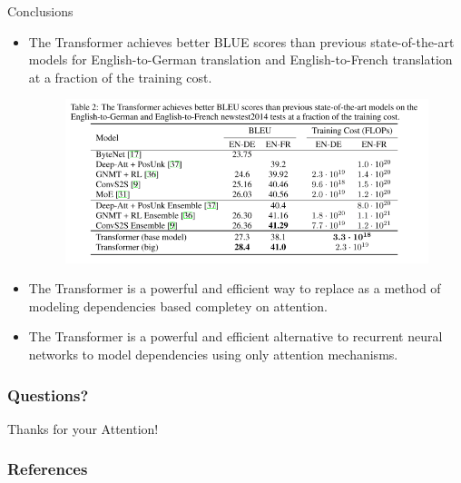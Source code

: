 \documentclass[handout]{beamer}
\begin{document}
\begin{frame}{Conclusions}
\begin{scriptsize}
\begin{itemize}

 \item The Transformer achieves better BLUE scores than previous state-of-the-art models for English-to-German translation and English-to-French translation at a fraction of the training cost.

      \begin{figure}[h]
        	\includegraphics[scale = 0.29]{pics/transformerresults.png}
        \end{figure}  

\item The Transformer is a powerful and efficient way to replace  as a method of modeling dependencies based completey on attention.


\item The Transformer is a powerful and efficient alternative to recurrent neural networks to model dependencies using only attention mechanisms.

 
\end{itemize}

\end{scriptsize}


\end{frame}

\begin{frame}
\frametitle{Questions?}
\begin{center}\LARGE Thanks for your Attention!\\ \end{center}



\end{frame}

\begin{frame}[allowframebreaks]\scriptsize
\frametitle{References}


%
\end{frame}  


\end{document}
